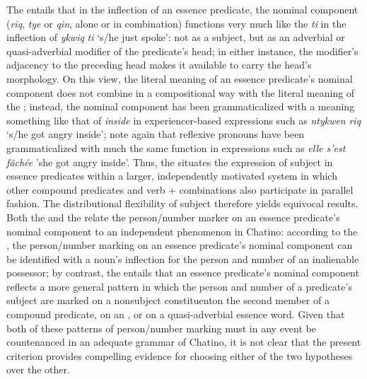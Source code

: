 \documentclass[output=paper]{langsci/langscibook}
\begin{document}
The  entails that in the inflection of an essence predicate, the nominal component (\emph{riq}, \emph{tye} or \emph{qin}, alone or in combination) functions very much like the  \emph{ti} in the inflection of \emph{ykwiq} \emph{ti} `s/he just spoke':  not as a subject, but as an adverbial or quasi-adverbial modifier of the predicate's head; in either instance, the modifier's adjacency to the preceding head makes it available to carry the head's  morphology.  On this view, the literal meaning of an essence predicate's nominal component does not combine in a compositional way with the literal meaning of the ; instead, the nominal component has been grammaticalized with a meaning something like that of  \emph{inside} in experiencer-based expressions such as \emph{ntykwen} \emph{riq} `s/he got angry inside'; note again that reflexive pronouns have been grammaticalized with much the same function in expressions such as \textit{elle s'est f\^ach\'ee} 'she got angry inside'.  Thus, the  situates the expression of subject  in essence predicates within a larger, independently motivated system in which other compound predicates and verb +  combinations also participate in parallel fashion.  
The distributional flexibility of subject  therefore yields equivocal results.  Both the  and the  relate the person/number marker on an essence predicate's nominal component to an independent phenomenon in Chatino:  according to the , the person/number marking on an essence predicate's nominal component can be identified with a noun's inflection for the person and number of an inalienable possessor; by contrast, the  entails that an essence predicate's nominal component reflects a more general pattern in which the person and number of a predicate's subject are marked on a nonsubject constituent\textemdash on the second member of a compound predicate, on an , or on a quasi-adverbial essence word.  Given that both of these patterns of person/number marking must in any event be countenanced in an adequate grammar of Chatino, it is not clear that the present criterion provides compelling evidence for choosing either of the two hypotheses over the other.
\end{document}

